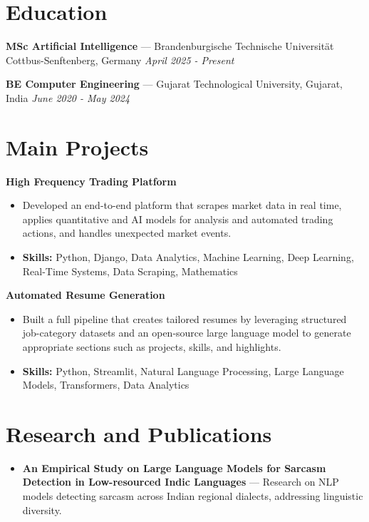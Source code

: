 \documentclass[a4paper,10pt]{article}
\begin{document}
\section*{Education}
\textbf{MSc Artificial Intelligence} — Brandenburgische Technische Universität Cottbus-Senftenberg, Germany \hfill \textit{April 2025 - Present}\par
\vspace{1.5pt}
\textbf{BE Computer Engineering} — Gujarat Technological University, Gujarat, India \hfill \textit{June 2020 - May 2024}\par

\section*{Main Projects}
\textbf{High Frequency Trading Platform}\par
\vspace{1pt}
\begin{itemize}
  \item Developed an end-to-end platform that scrapes market data in real time, applies quantitative and AI models for analysis and automated trading actions, and handles unexpected market events.
  \item \textbf{Skills:} Python, Django, Data Analytics, Machine Learning, Deep Learning, Real-Time Systems, Data Scraping, Mathematics
\end{itemize}
\vspace{3pt}
\textbf{Automated Resume Generation}\par
\vspace{1pt}
\begin{itemize}
  \item Built a full pipeline that creates tailored resumes by leveraging structured job-category datasets and an open-source large language model to generate appropriate sections such as projects, skills, and highlights.
  \item \textbf{Skills:} Python, Streamlit, Natural Language Processing, Large Language Models, Transformers, Data Analytics
\end{itemize}

\section*{Research and Publications}
\begin{itemize}
\item \textbf{An Empirical Study on Large Language Models for Sarcasm Detection in Low-resourced Indic Languages} — Research on NLP models detecting sarcasm across Indian regional dialects, addressing linguistic diversity.
\end{itemize}
\end{document}
